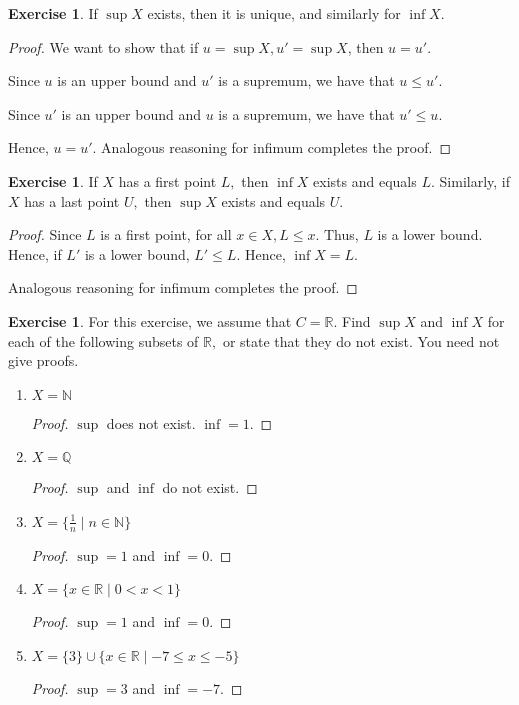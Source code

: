 \documentclass[11pt]{article}
\newcommand{\bbN}{\mathbb{N}}
\newcommand{\bbQ}{\mathbb{Q}}
\newcommand{\bbR}{\mathbb{R}}
\renewcommand{\_}[1]{\underline{ #1 }}
\theoremstyle{definition}
\newtheorem{exercise}[theorem]{Exercise}
\numberwithin{equation}{subsection}
\begin{document}
\begin{exercise}  If $\sup X$ exists, then it is unique, and similarly for $\inf X$.
\begin{proof}
We want to show that if $u = \sup X, u' = \sup X$, then $u = u'$.

Since $u$ is an upper bound and $u'$ is a supremum, we have that $u \leq u'$.

Since $u'$ is an upper bound and $u$ is a supremum, we have that $u' \leq u$.

Hence, $u = u'$. Analogous reasoning for infimum completes the proof.

\renewcommand\qedsymbol{QED}
\end{proof}
\end{exercise}

\begin{exercise} If $X$ has a first point $L,$ then $\inf X$ exists and equals $L.$ Similarly, if $X$ has a last point $U,$ then $\sup X$ exists and equals $U.$
\begin{proof}
Since $L$ is a first point, for all $x \in X, L \leq x$. Thus, $L$ is a lower bound. Hence, if $L'$ is a lower bound, $L' \leq L$. Hence, $\inf X = L$.

Analogous reasoning for infimum completes the proof.

\renewcommand\qedsymbol{QED}
\end{proof}
\end{exercise}


\begin{exercise} For this exercise, we assume that $C=\bbR.$ Find $\sup X$ and $\inf X$ for each of the following subsets
of $\bbR,$ or state that they do not exist. You need not give proofs.
\begin{enumerate}
\item $X=\bbN$
\begin{proof}
$\sup$ does not exist. $\inf = 1$.

\renewcommand\qedsymbol{QED}
\end{proof}
\item $X=\bbQ$
\begin{proof}
$\sup$ and $\inf$ do not exist.

\renewcommand\qedsymbol{QED}
\end{proof}
\item $X=\{\frac1n\mid n\in\bbN\}$
\begin{proof}
$\sup = 1$ and $\inf = 0$.

\renewcommand\qedsymbol{QED}
\end{proof}
\item $X=\{x\in\bbR\mid 0<x<1\}$
\begin{proof}
$\sup = 1$ and $\inf = 0$.

\renewcommand\qedsymbol{QED}
\end{proof}
\item  $X=\{3\}\cup \{x\in\bbR\mid -7\leq x\leq -5\}$ 
\begin{proof}
$\sup = 3$ and $\inf = -7$.

\renewcommand\qedsymbol{QED}
\end{proof}
\end{enumerate}
\end{exercise}
\end{document}
